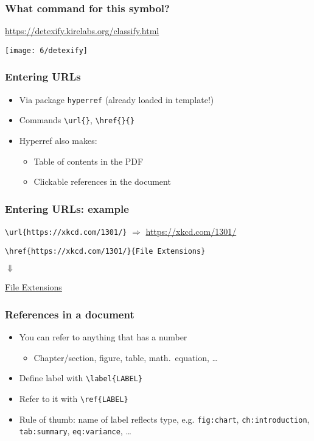 \documentclass[aspectratio=169]{beamer}
\begin{document}
\begin{frame}
  \frametitle{What command for this symbol?}

  \url{https://detexify.kirelabs.org/classify.html}

  \centering
  \texttt{[image: 6/detexify]}

\end{frame}

\begin{frame}[fragile]
  \frametitle{Entering URLs }

  \begin{itemize}
    \item Via package \texttt{hyperref} (already loaded in template!)
    \item Commands \verb+\url{}+, \verb+\href{}{}+
    \item Hyperref also makes:
          \begin{itemize}
            \item Table of contents in the PDF
            \item Clickable references in the document
          \end{itemize}
  \end{itemize}

\end{frame}

\begin{frame}[fragile]
  \frametitle{Entering URLs: example}

  \verb+\url{https://xkcd.com/1301/}+ $\Rightarrow$ \url{https://xkcd.com/1301/}

  \bigskip

  \verb+\href{https://xkcd.com/1301/}{File Extensions}+

  $\Downarrow$

  \href{https://xkcd.com/1301/}{File Extensions}

\end{frame}

\begin{frame}[fragile]
  \frametitle{References in a document}

  \begin{itemize}
    \item You can refer to anything that has a number
    \begin{itemize}
        \item Chapter/section, figure, table, math.~equation, \ldots
    \end{itemize}
    \item Define label with \verb+\label{LABEL}+
    \item Refer to it with \verb+\ref{LABEL}+
    \item Rule of thumb: name of label reflects type, e.g. \texttt{fig:chart}, \texttt{ch:introduction}, \texttt{tab:summary}, \texttt{eq:variance}, \ldots   
  \end{itemize}

\end{frame}
\end{document}

